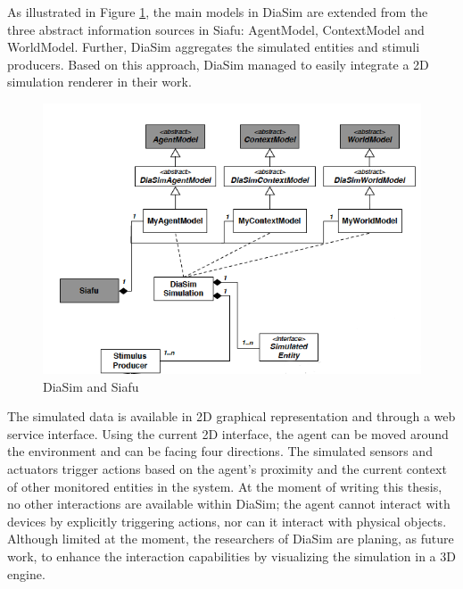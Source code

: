As illustrated in Figure \ref{fig:diasim_and_siafu}, the main models in DiaSim are extended from the three abstract information sources in Siafu: AgentModel, ContextModel and WorldModel. Further, DiaSim aggregates the simulated entities and stimuli producers. Based on this approach, DiaSim managed to easily integrate a 2D simulation renderer in their work.

\begin{figure}[H]
	\centering
	\includegraphics[width=\linewidth]{gfx/Chapter2/diasim_and_siafu}
	\caption{DiaSim and Siafu}
	\label{fig:diasim_and_siafu}
\end{figure}

The simulated data is available in 2D graphical representation and through a web service interface. Using the current 2D interface, the agent can be moved around the environment and can be facing four directions. The simulated sensors and actuators trigger actions based on the agent's proximity and the current context of other monitored entities in the system. At the moment of writing this thesis, no other interactions are available within DiaSim; the agent cannot interact with devices by explicitly triggering actions, nor can it interact with physical objects.\\

Although limited at the moment, the researchers of DiaSim are planing, as future work, to enhance the interaction capabilities by visualizing the simulation in a 3D engine.
